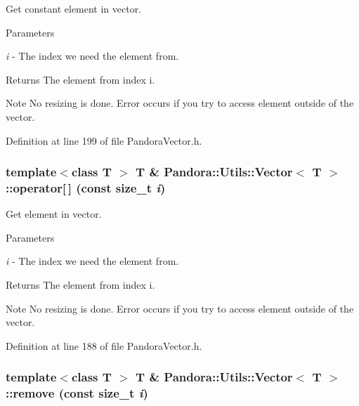 Get constant element in vector. 
\begin{DoxyParams}{Parameters}
\item[{\em i}]-\/ The index we need the element from. \end{DoxyParams}
\begin{DoxyReturn}{Returns}
The element from index i. 
\end{DoxyReturn}
\begin{DoxyNote}{Note}
No resizing is done. Error occurs if you try to access element outside of the vector. 
\end{DoxyNote}


Definition at line 199 of file PandoraVector.h.\hypertarget{classPandora_1_1Utils_1_1Vector_adef2d8c160a9f9c2398f3c92f7874f4e}{
\subsubsection[{operator[]}]{\setlength{\rightskip}{0pt plus 5cm}template$<$class T $>$ T \& {\bf Pandora::Utils::Vector}$<$ T $>$::operator\mbox{[}$\,$\mbox{]} (const size\_\-t {\em i})}}
\label{classPandora_1_1Utils_1_1Vector_adef2d8c160a9f9c2398f3c92f7874f4e}


Get element in vector. 
\begin{DoxyParams}{Parameters}
\item[{\em i}]-\/ The index we need the element from. \end{DoxyParams}
\begin{DoxyReturn}{Returns}
The element from index i. 
\end{DoxyReturn}
\begin{DoxyNote}{Note}
No resizing is done. Error occurs if you try to access element outside of the vector. 
\end{DoxyNote}


Definition at line 188 of file PandoraVector.h.\hypertarget{classPandora_1_1Utils_1_1Vector_a321442d5b814dd8709319ad109af1700}{
\subsubsection[{remove}]{\setlength{\rightskip}{0pt plus 5cm}template$<$class T $>$ T \& {\bf Pandora::Utils::Vector}$<$ T $>$::remove (const size\_\-t {\em i})}}
\label{classPandora_1_1Utils_1_1Vector_a321442d5b814dd8709319ad109af1700}


